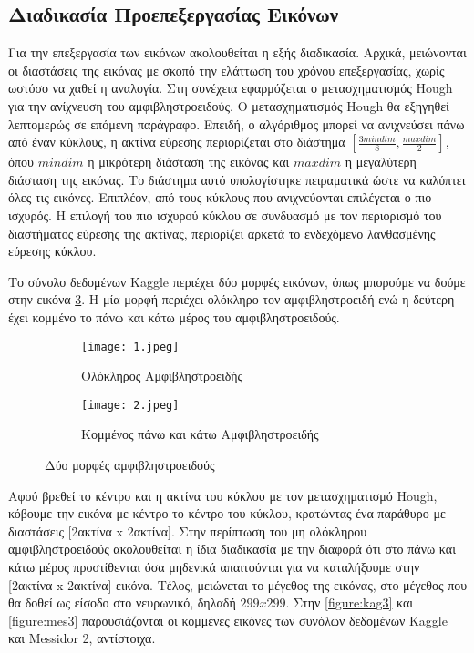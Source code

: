 \subsection{Διαδικασία Προεπεξεργασίας Εικόνων} 
\label{sec:4.2.1}
Για την επεξεργασία των εικόνων ακολουθείται η εξής διαδικασία. Αρχικά, μειώνονται οι διαστάσεις της εικόνας με σκοπό την ελάττωση του χρόνου επεξεργασίας, χωρίς ωστόσο να χαθεί η αναλογία. Στη συνέχεια εφαρμόζεται ο μετασχηματισμός Hough για την ανίχνευση του αμφιβληστροειδούς. Ο μετασχηματισμός Hough θα εξηγηθεί λεπτομερώς σε επόμενη παράγραφο. Επειδή, ο αλγόριθμος μπορεί να ανιχνεύσει πάνω από έναν κύκλους, η ακτίνα εύρεσης περιορίζεται στο διάστημα $[\frac{3mindim}{8},\frac{maxdim}{2}]$, όπου $mindim$ η μικρότερη διάσταση της εικόνας και $maxdim$ η μεγαλύτερη διάσταση της εικόνας. Το διάστημα αυτό υπολογίστηκε πειραματικά ώστε να καλύπτει όλες τις εικόνες. Επιπλέον, από τους κύκλους που ανιχνεύονται επιλέγεται ο πιο ισχυρός. Η επιλογή του πιο ισχυρού κύκλου σε συνδυασμό με τον περιορισμό του διαστήματος εύρεσης της ακτίνας, περιορίζει αρκετά το ενδεχόμενο λανθασμένης εύρεσης κύκλου. 

Το σύνολο δεδομένων Kaggle περιέχει δύο μορφές εικόνων, όπως μπορούμε να δούμε στην εικόνα \ref{figure:2morfes}. Η μία μορφή περιέχει ολόκληρο τον αμφιβληστροειδή ενώ η δεύτερη έχει κομμένο το πάνω και κάτω μέρος του αμφιβληστροειδούς.

\begin{figure}[!h]
\centering
\begin{subfigure}{.5\textwidth}
  \centering
  \texttt{[image: 1.jpeg]}
  \caption{Ολόκληρος Αμφιβληστροειδής}
  \label{fig:2morfes1}
\end{subfigure}%
\begin{subfigure}{.5\textwidth}
  \centering
  \texttt{[image: 2.jpeg]}
  \caption{Κομμένος πάνω και κάτω Αμφιβληστροειδής}
  \label{fig:2morfes2}
\end{subfigure}
\caption{Δύο μορφές αμφιβληστροειδούς}
\label{figure:2morfes}
\end{figure}
  
Αφού βρεθεί το κέντρο και η ακτίνα του κύκλου με τον μετασχηματισμό Hough, κόβουμε την εικόνα με κέντρο το κέντρο του κύκλου, κρατώντας ένα παράθυρο με διαστάσεις [2ακτίνα x 2ακτίνα]. Στην περίπτωση του μη ολόκληρου αμφιβληστροειδούς ακολουθείται η ίδια διαδικασία με την διαφορά ότι στο πάνω και κάτω μέρος προστίθενται όσα μηδενικά απαιτούνται για να καταλήξουμε στην [2ακτίνα x 2ακτίνα] εικόνα. Τέλος, μειώνεται το μέγεθος της εικόνας, στο μέγεθος που θα δοθεί ως είσοδο στο νευρωνικό, δηλαδή $299x299$. Στην \ref{figure:kag3} και \ref{figure:mes3} παρουσιάζονται οι κομμένες εικόνες των συνόλων δεδομένων Kaggle και Messidor 2, αντίστοιχα.

